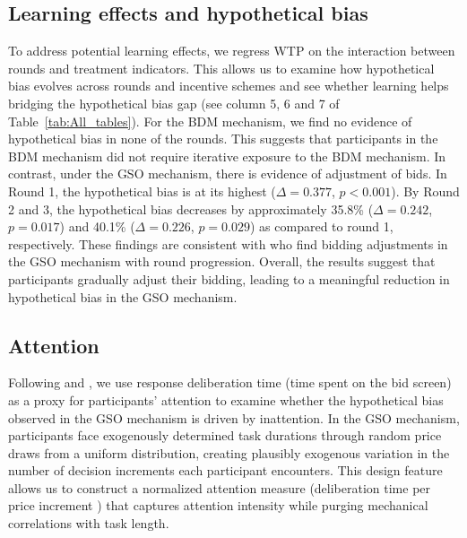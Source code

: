 \documentclass[12pt]{article}
\begin{document}
\subsection{Learning effects and hypothetical bias}
\label{Sec: learning}
To address potential learning effects, we regress WTP on the interaction between rounds and treatment indicators. This allows us to examine how hypothetical bias evolves across rounds and incentive schemes and see whether learning helps bridging the hypothetical bias gap (see column 5, 6 and 7 of Table~\ref{tab:All_tables}). For the BDM mechanism, we find no evidence of hypothetical bias in none of the rounds. This suggests that participants in the BDM mechanism did not require iterative exposure to the BDM mechanism. 
In contrast, under the GSO mechanism, there is evidence of adjustment of bids. In Round 1, the hypothetical bias is at its highest (\(\Delta = 0.377\), \(p < 0.001\)). By Round 2 and 3, the hypothetical bias decreases by approximately 35.8\% (\(\Delta = 0.242\), \(p =0.017\)) and 40.1\% (\(\Delta = 0.226\), \(p =0.029\))  as compared to round 1, respectively. These findings are consistent with \citet{brown_is_2023} who find bidding adjustments in the GSO mechanism with round progression. 
Overall, the results suggest that participants gradually adjust their bidding, leading to a meaningful reduction in hypothetical bias in the GSO mechanism. 






\subsection{Attention}
\label{Sec: Attention}

Following \citet{alos2021cognitive} and \citet{alaoui2016endogenous}, we use response deliberation time (time spent on the bid screen) as a proxy for participants’ attention to examine whether the hypothetical bias observed in the GSO mechanism is driven by inattention.
In the GSO mechanism, participants face exogenously determined task durations through random price draws from a uniform distribution, creating plausibly exogenous variation in the number of decision increments each participant encounters. This design feature allows us to construct a normalized attention measure (deliberation time per price increment%
) that captures attention intensity while purging mechanical correlations with task length. 
\end{document}
